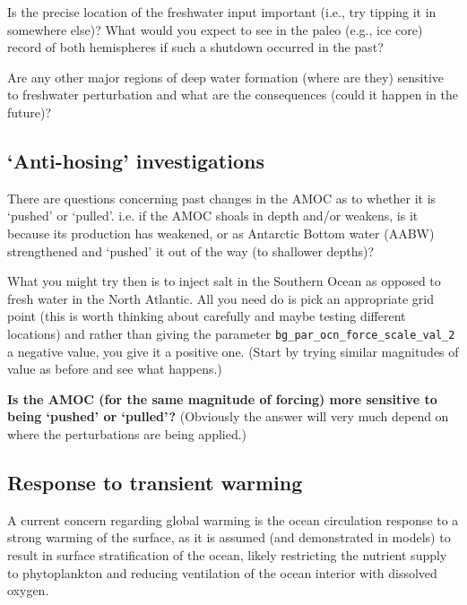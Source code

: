 \documentclass[11pt,fleqn]{book} %
\begin{document}
Is the precise location of the freshwater input important (i.e., try tipping it in somewhere else)? What would you expect to see in the paleo (e.g., ice core) record of both hemispheres if such a shutdown occurred in the past?

Are any other major regions of deep water formation (where are they) sensitive to freshwater perturbation and what are the consequences (could it happen in the future)?


\subsection{‘Anti-hosing’ investigations}

There are questions concerning past changes in the AMOC as to whether it is ‘pushed’ or ‘pulled’. i.e. if the AMOC shoals in depth and/or weakens, is it because its production has weakened, or as Antarctic Bottom water (AABW) strengthened and ‘pushed’ it out of the way (to shallower depths)?

What you might try then is to inject salt in the Southern Ocean as opposed to fresh water in the North Atlantic. All you need do is pick an appropriate grid point (this is worth thinking about carefully and maybe testing different locations) and rather than giving the parameter \texttt{bg\_par\_ocn\_force\_scale\_val\_2} a negative value, you give it a positive one. (Start by trying similar magnitudes of value as before and see what happens.) 

\textbf{Is the AMOC (for the same magnitude of forcing) more sensitive to being ‘pushed’ or ‘pulled’?} (Obviously the answer will very much depend on where the perturbations are being applied.)


\subsection{Response to transient warming}

A current concern regarding global warming is the ocean circulation response to a strong warming of the surface, as it is assumed (and demonstrated in models) to result in surface stratification of the ocean, likely restricting the nutrient supply to phytoplankton and reducing ventilation of the ocean interior with dissolved oxygen.
\end{document}

